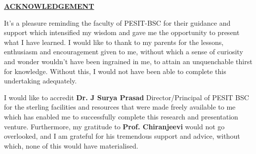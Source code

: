 \documentclass[12pt,a4paper]{report}
\begin{document}


\begin{center}\underline{ \Large\textbf{ACKNOWLEDGEMENT}}\end{center}
\justify
\vspace{5mm}
It's a pleasure reminding the faculty of PESIT-BSC for their guidance and support which intensified my wisdom and gave me the opportunity to present what I have learned. I would like to thank to my parents for the lessons, enthusiasm and encouragement given to me, without which a sense of curiosity and wonder wouldn't have been ingrained in me, to attain an unquenchable thirst for knowledge. Without this, I would not have been able to complete this undertaking adequately.\\
\vspace{5mm}
\justify

I would like to accredit \textbf{Dr. J Surya Prasad} Director/Principal of PESIT BSC for the sterling facilities and resources that were made freely available to me which has enabled me to successfully complete this research and presentation venture.\newline
Furthermore, my gratitude to \textbf{Prof. Chiranjeevi} would not go overlooked, and I am grateful for his tremendous support and advice, without which, none of this would have materialised.\\
\vspace{5mm}
\justify
\end{document}
